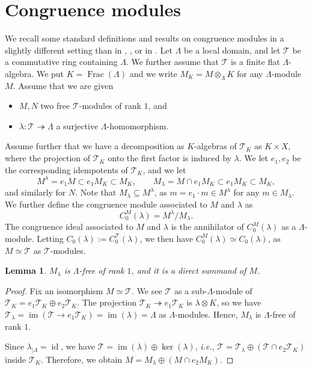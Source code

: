 \documentclass[12pt]{amsart}
\newcommand\cT{\mathcal{T}}
\DeclareMathOperator{\id}{id}
\DeclareMathOperator{\im}{im}
\DeclareMathOperator{\Frac}{Frac}
\theoremstyle{defstyle}
\theoremstyle{thmstyle}
\newtheorem{lemmaAppendix}{Lemma}
\begin{document}
\section{Congruence modules}\label{appendix}
We recall some standard definitions and results on congruence modules in a slightly different setting than in \cite[\S2.7.5]{eigenbook}, \cite[\S6.2.2]{hidapune}, or in \cite[\S2]{tilouineurbanANT}. Let $\Lambda$ be a local domain, and let $\cT$ be a commutative ring containing $\Lambda$. We further assume that $\cT$ is a finite flat $\Lambda$-algebra. We put $K=\Frac(\Lambda)$ and we write $M_K=M \otimes_\Lambda K$ for any $\Lambda$-module $M$. Assume that we are given 
\begin{itemize}
	\item $M,N$ two free $\cT$-modules of rank $1$, and
	\item $\lambda \colon \cT \twoheadrightarrow \Lambda$ a surjective $\Lambda$-homomorphism. 
\end{itemize}
Assume further that we have a decomposition as $K$-algebras of $\cT_K$ as $K \times X$, where the projection of $\cT_K$ onto the first factor is induced by $\lambda$. We let $e_1,e_2$ be the corresponding idempotents of $\cT_K$, and we let
\[M^\lambda=e_1 M \subset e_1 M_K \subset M_K, \qquad M_\lambda=M \cap e_1 M_K \subset e_1 M_K \subset M_K,\]
and similarly for $N$. Note that $M_\lambda \subseteq M^\lambda$, as $m=e_1\cdot m \in M^\lambda$ for any $m\in M_\lambda$. We further define the congruence module associated to $M$ and $\lambda$ as
\[C_0^M(\lambda)=M^\lambda/M_\lambda.\]
The congruence ideal associated to $M$ and $\lambda$ is the annihilator of $C^M_0(\lambda)$ as a $\Lambda$-module.
Letting $C_0(\lambda):=C_0^\cT(\lambda)$, we then have $C_0^M(\lambda) \simeq C_0(\lambda)$, as $M\simeq \cT$ as $\cT$-modules.

\begin{lemmaAppendix}\label{lem:appendix_direct_summand}
	$M_\lambda$ is $\Lambda$-free of rank $1$, and it is a direct summand of $M$. 
\end{lemmaAppendix}
\begin{proof}
Fix an isomorphism $M\simeq\cT$. We see $\cT$ as a sub-$\Lambda$-module of $\cT_K=e_1\cT_K\oplus e_2\cT_K$. The projection $\cT_K \twoheadrightarrow e_1 \cT_K$ is $\lambda\otimes K$, so we have $\cT_\lambda=\im(\cT \to e_1 \cT_K)=\im(\lambda)=\Lambda$ as $\Lambda$-modules. Hence, $M_\lambda$ is $\Lambda$-free of rank $1$.

Since $\lambda_{|\Lambda}=\id$, we have $\cT = \im(\lambda) \oplus \ker(\lambda)$, \textit{i.e.}, $\cT=\cT_\lambda \oplus (\cT\cap e_2\cT_K)$ inside $\cT_K$. Therefore, we obtain $M=M_\lambda \oplus (M\cap e_2 M_K)$.
\end{proof}
\end{document}

